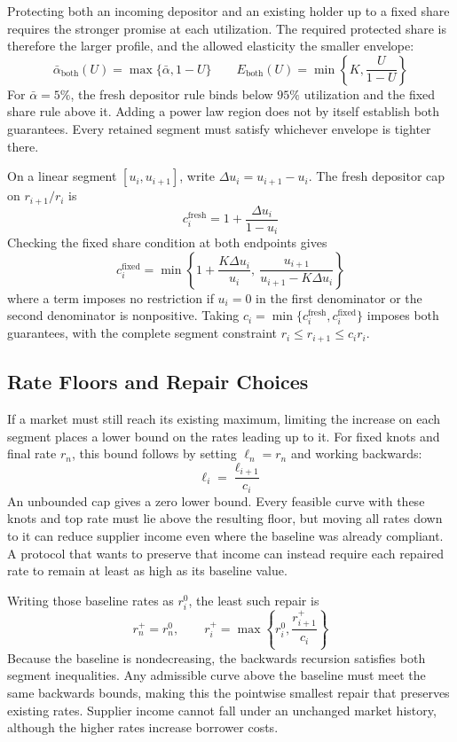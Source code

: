 \documentclass[11pt,a4paper]{article}
\begin{document}
Protecting both an incoming depositor and an existing holder up to a fixed share requires the stronger promise at each utilization. The required protected share is therefore the larger profile, and the allowed elasticity the smaller envelope:
\[
\bar\alpha_{\mathrm{both}}(U)=\max\{\bar\alpha,1-U\}
\qquad
E_{\mathrm{both}}(U)=\min\left\{K,\frac{U}{1-U}\right\}
\]
For $\bar\alpha=5\%$, the fresh depositor rule binds below $95\%$ utilization and the fixed share rule above it. Adding a power law region does not by itself establish both guarantees. Every retained segment must satisfy whichever envelope is tighter there.

On a linear segment $[u_i,u_{i+1}]$, write $\Delta u_i=u_{i+1}-u_i$. The fresh depositor cap on $r_{i+1}/r_i$ is
\[
c_i^{\mathrm{fresh}}=1+\frac{\Delta u_i}{1-u_i}
\]
Checking the fixed share condition at both endpoints gives
\[
c_i^{\mathrm{fixed}}=\min\left\{
1+\frac{K\Delta u_i}{u_i},\
\frac{u_{i+1}}{u_{i+1}-K\Delta u_i}
\right\}
\]
where a term imposes no restriction if $u_i=0$ in the first denominator or the second denominator is nonpositive. Taking $c_i=\min\{c_i^{\mathrm{fresh}},c_i^{\mathrm{fixed}}\}$ imposes both guarantees, with the complete segment constraint $r_i\leq r_{i+1}\leq c_i r_i$.

\subsection{Rate Floors and Repair Choices}

If a market must still reach its existing maximum, limiting the increase on each segment places a lower bound on the rates leading up to it. For fixed knots and final rate $r_n$, this bound follows by setting $\ell_n=r_n$ and working backwards:
\[
\ell_i=\frac{\ell_{i+1}}{c_i}
\]
An unbounded cap gives a zero lower bound. Every feasible curve with these knots and top rate must lie above the resulting floor, but moving all rates down to it can reduce supplier income even where the baseline was already compliant. A protocol that wants to preserve that income can instead require each repaired rate to remain at least as high as its baseline value.

Writing those baseline rates as $r_i^0$, the least such repair is
\[
r_n^+=r_n^0,\qquad
r_i^+=\max\left\{r_i^0,\frac{r_{i+1}^+}{c_i}\right\}
\]
Because the baseline is nondecreasing, the backwards recursion satisfies both segment inequalities. Any admissible curve above the baseline must meet the same backwards bounds, making this the pointwise smallest repair that preserves existing rates. Supplier income cannot fall under an unchanged market history, although the higher rates increase borrower costs.
\end{document}
